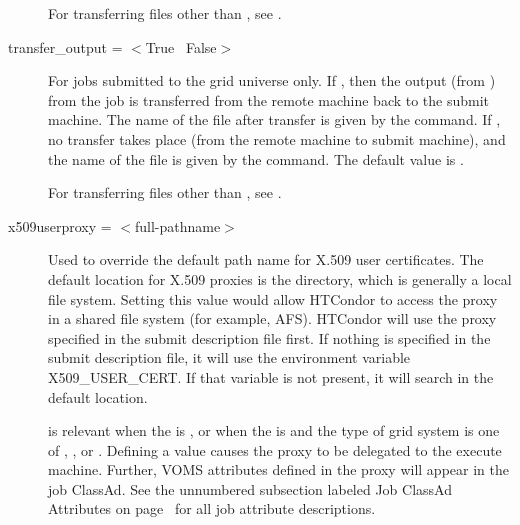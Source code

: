 \begin{description}
For transferring files other than ,
see .

\label{condor-submit-transfer-output}
\item[transfer\_output = $<$True \Bar\ False$>$]
For jobs submitted to the grid universe only.
If , then the output (from ) from the job
is transferred from the remote machine back to the submit machine.
The name of the file after transfer is given
by the  command.
If , no transfer takes place (from the remote machine
to submit machine),
and the name of the file is given
by the  command.
The default value is .

For transferring files other than ,
see .


\label{condor-submit-x509userproxy}
\item[x509userproxy = $<$full-pathname$>$] Used to override the default
path name for X.509 user certificates. The default location for X.509 proxies
is the  directory,
which is generally a local file system.
Setting
this value would allow HTCondor to access the proxy in a shared file system
(for example, AFS).
HTCondor will use the proxy specified in the submit description file first.
If nothing is specified in the submit description file,
it will use the environment variable X509\_USER\_CERT.
If that variable is not present,
it will search in the default location.

 is relevant when
the  is ,
or when the  is 
and the type of grid system is one of ,
, or .
Defining a value causes the proxy to be delegated to the execute machine.
Further, VOMS attributes defined in the proxy will appear in
the job ClassAd.
See the unnumbered subsection labeled Job ClassAd Attributes
on page~\pageref{sec:Job-ClassAd-Attributes} for all job attribute descriptions.

\end{description} 


